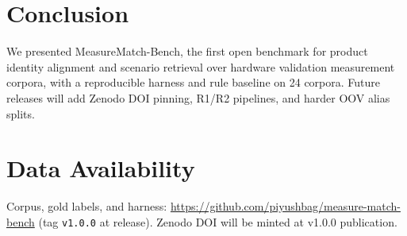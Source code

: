 \documentclass[conference]{IEEEtran}
\begin{document}
\section{Conclusion}
We presented MeasureMatch-Bench, the first open benchmark for product identity alignment and scenario retrieval over hardware validation measurement corpora, with a reproducible harness and rule baseline on 24 corpora.
Future releases will add Zenodo DOI pinning, R1/R2 pipelines, and harder OOV alias splits.

\section*{Data Availability}
Corpus, gold labels, and harness: \url{https://github.com/piyushbag/measure-match-bench} (tag \texttt{v1.0.0} at release).
Zenodo DOI will be minted at v1.0.0 publication.



\balance
\end{document}
